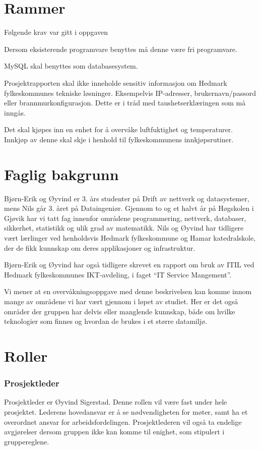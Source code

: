 \section{Rammer}
Følgende krav var gitt i oppgaven
\begin{itemize*}
	\item Dersom eksisterende programvare benyttes må denne være fri programvare.
	\item MySQL skal benyttes som databasesystem.
	\item Prosjektrapporten skal ikke inneholde sensitiv informasjon om Hedmark fylkeskommunes tekniske løsninger. Eksempelvis IP-adresser, brukernavn/passord eller brannmurkonfigurasjon. Dette er i tråd med taushetserklæringen som må inngås.
	\item Det skal kjøpes inn en enhet for å overvåke luftfuktighet og temperaturer. Innkjøp av denne skal skje i henhold til fylkeskommunens innkjøpsrutiner.
\end{itemize*}

\section{Faglig bakgrunn}
Bjørn-Erik og Øyvind er 3. års studenter på Drift av nettverk og datasystemer, mens Nils går 3. året på Dataingeniør. Gjennom to og et halvt år på Høgskolen i Gjøvik har vi tatt fag innenfor områdene programmering, nettverk, databaser, sikkerhet, statistikk og ulik grad av matematikk. Nils og Øyvind har tidligere vært lærlinger ved henholdsvis Hedmark fylkeskommune og Hamar katedralskole, der de fikk kunnskap om deres applikasjoner og infrastruktur.

Bjørn-Erik og Øyvind har også tidligere skrevet en rapport om bruk av ITIL ved Hedmark fylkeskommunes IKT-avdeling, i faget ``IT Service Mangement''.

Vi mener at en overvåkningsoppgave med denne beskrivelsen kan komme innom mange av områdene vi har vært gjennom i løpet av studiet. Her er det også områder der gruppen har delvis eller manglende kunnskap, både om hvilke teknologier som finnes og hvordan de brukes i et større datamiljø.

\section{Roller}
\subsubsection{Prosjektleder}
Prosjektleder er Øyvind Sigerstad. Denne rollen vil være fast under hele prosjektet. Lederens hovedansvar er å se nødvendigheten for møter, samt ha et overordnet ansvar for arbeidsfordelingen. Prosjektlederen vil også ta endelige avgjørelser dersom gruppen ikke kan komme til enighet, som stipulert i gruppereglene.

